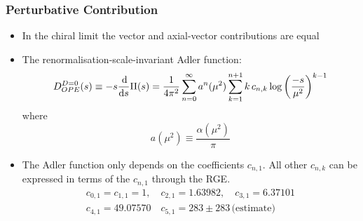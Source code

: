 \documentclass{beamer}
\begin{document}
\begin{frame}
  \frametitle{Perturbative Contribution}
  \begin{itemize}
  \item In the chiral limit the vector and axial-vector contributions are equal
  \item The renormalisation-scale-invariant Adler function:
    \begin{equation}
      D_{OPE}^{D=0}(s) \equiv -s \frac{\dif}{\dif s} \Pi(s)
      = \frac{1}{4 \pi^2} \sum_{n=0}^\infty a^n(\mu^2) \sum_{k=1}^{n+1} k\, c_{n,k} \log\left( \frac{-s}{\mu^2} \right)^{k-1}
    \end{equation}
    where
    \begin{equation}
      a(\mu^2) \equiv \frac{\alpha(\mu^2)}{\pi}
    \end{equation}
  \item The Adler function only depends on the coefficients \(c_{n,1}\). All
    other \(c_{n,k}\) can be expressed in terms of the \(c_{n,1}\) through the
    RGE.
    \begin{equation}
      \begin{split}
        c_{0,1} = c_{1,1} = 1, \quad c_{2,1} = 1.63982, \quad c_{3,1} = 6.37101 \\
        c_{4,1} = 49.07570  \quad c_{5,1} = 283 \pm 283\, \text{(estimate)}
      \end{split}
    \end{equation}
  \end{itemize}
\end{frame}
\end{document}
